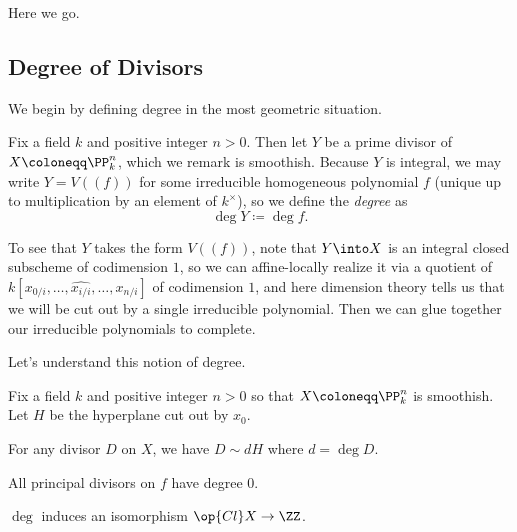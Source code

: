 \documentclass[../notes.tex]{subfiles}
\begin{document}
Here we go.

\subsection{Degree of Divisors}
We begin by defining degree in the most geometric situation.
\begin{definition}[degree]
	Fix a field $k$ and positive integer $n>0$. Then let $Y$ be a prime divisor of $X\coloneqq\PP^n_k$, which we remark is smoothish. Because $Y$ is integral, we may write $Y=V((f))$ for some irreducible homogeneous polynomial $f$ (unique up to multiplication by an element of $k^\times$), so we define the \textit{degree} as
	\[\deg Y\coloneqq\deg f.\]
\end{definition}
\begin{remark}
	To see that $Y$ takes the form $V((f))$, note that $Y\into X$ is an integral closed subscheme of codimension $1$, so we can affine-locally realize it via a quotient of $k[x_{0/i},\ldots,\widehat{x_{i/i}},\ldots,x_{n/i}]$ of codimension $1$, and here dimension theory tells us that we will be cut out by a single irreducible polynomial. Then we can glue together our irreducible polynomials to complete.
\end{remark}
Let's understand this notion of degree.
\begin{proposition}
	Fix a field $k$ and positive integer $n>0$ so that $X\coloneqq\PP^n_k$ is smoothish. Let $H$ be the hyperplane cut out by $x_0$.
	\begin{listalph}
		\item For any divisor $D$ on $X$, we have $D\sim dH$ where $d=\deg D$.
		\item All principal divisors on $f$ have degree $0$.
		\item $\deg$ induces an isomorphism $\op{Cl}X\to\ZZ$.
	\end{listalph}
\end{proposition}
\end{document}
